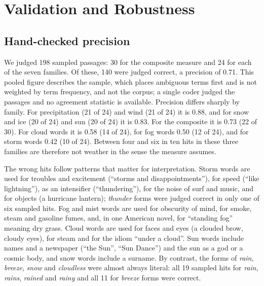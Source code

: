 \documentclass[11pt]{article}
\begin{document}
\section{Validation and Robustness}

\subsection{Hand-checked precision}

We judged 198 sampled passages: 30 for the composite measure and 24 for each of the seven families. Of these, 140 were judged correct, a precision of 0.71. This pooled figure describes the sample, which places ambiguous terms first and is not weighted by term frequency, and not the corpus; a single coder judged the passages and no agreement statistic is available.
Precision differs sharply by family. For precipitation (21 of 24) and wind (21 of 24) it is 0.88, and for snow and ice (20 of 24) and sun (20 of 24) it is 0.83.
For the composite it is 0.73 (22 of 30).
For cloud words it is 0.58 (14 of 24), for fog words 0.50 (12 of 24), and for storm words 0.42 (10 of 24).
Between four and six in ten hits in these three families are therefore not weather in the sense the measure assumes.

The wrong hits follow patterns that matter for interpretation. Storm words are used for troubles and excitement (``storms and disappointments''), for speed (``like lightning''), as an intensifier (``thundering''), for the noise of surf and music, and for objects (a hurricane lantern); \emph{thunder} forms were judged correct in only one of six sampled hits. Fog and mist words are used for obscurity of mind, for smoke, steam and gasoline fumes, and, in one American novel, for ``standing fog'' meaning dry grass. Cloud words are used for faces and eyes (a clouded brow, cloudy eyes), for steam and for the idiom ``under a cloud''. Sun words include names and a newspaper (``the Sun'', ``Sun Dance'') and the sun as a god or a cosmic body, and snow words include a surname. By contrast, the forms of \emph{rain}, \emph{breeze}, \emph{snow} and \emph{cloudless} were almost always literal: all 19 sampled hits for \emph{rain}, \emph{rains}, \emph{rained} and \emph{rainy} and all 11 for \emph{breeze} forms were correct.
\end{document}
